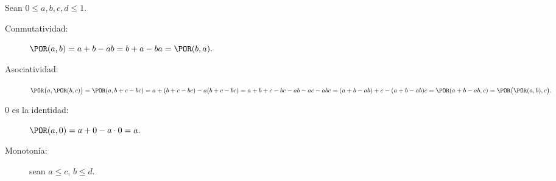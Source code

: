 
Sean \(0 ≤ a, b, c, d ≤ 1\).
\begin{description}
  \item[Conmutatividad:]
    \(
      \POR(a, b) =
      a + b - ab =
      b + a - ba =
      \POR(b, a).
    \)
  \item[Asociatividad:]
    \(
      \POR\bigl(a, \POR(b, c)\bigr) =
      \POR(a, b + c - bc) =
      a + (b + c - bc) - a(b + c - bc) =
      a + b + c - bc - ab - ac - abc =
      (a + b - ab) + c - (a + b - ab)c =
      \POR(a + b - ab, c) =
      \POR\bigl(\POR(a, b), c\bigr).
    \)
  \item[0 es la identidad:]
    \(
      \POR(a, 0) = a + 0 - a\cdot 0 = a.
    \)
  \item[Monotonía:] sean \(a ≤ c\), \(b ≤ d\).
\end{description}


